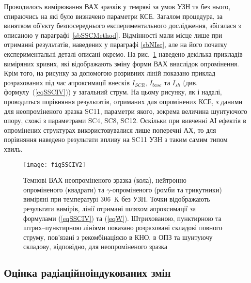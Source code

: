 Проводилось вимірювання ВАХ зразків у темряві за умов УЗН та без нього, спираючись на які було визначено параметри КСЕ.
Загалом процедура, за винятком об'єкту безпосереднього експериментального дослідження,
збігалася з описаною у параграфі~\ref{sbSSCMethod}.
Відмінності мали місце лише при отриманні результатів, наведених у параграфі \ref{sbNIsc},
але на його початку експериментальні деталі описані окремо.
На рис.~\ref{figSSCIV2} наведено декілька прикладів виміряних кривих, які відображають
зміну форми ВАХ внаслідок опромінення.
Крім того, на рисунку за допомогою розривних ліній показано приклад розрахованих під час апроксимації внесків $I_{SCR}$, $I_{base}$ та $I_{sh}$
(див. формулу~(\ref{eqSSCIV})) у загальний струм.
На цьому рисунку, як і надалі, проводиться порівняння результатів,
отриманих для опромінених КСЕ, з даними для неопроміненого зразка SC11, параметри якого, зокрема величина шунтуючого опору,
схожі з параметрами SC4, SC8, SC12.
Оскільки при вивченні АІ ефектів в опромінених структурах використовувалися лише поперечні АХ,
то для порівняння наведено результати впливу на SC11 УЗН з таким самим типом хвиль.

\begin{figure}
\center
\texttt{[image: figSSCIV2]}%
\caption{\label{figSSCIV2}
Темнові ВАХ неопроміненого зразка (кола), нейтронно--опроміненого (квадрати) та $\gamma$-опроміненого (ромби та трикутники) виміряні при температурі 306~K без УЗН.
Точки відображають результати вимірів, лінії отримані шляхом апроксимації за формулами (\ref{eqSSCIV}) та (\ref{eqW}).
Штрихованою, пунктирною та штрих--пунктирною лініями показано розраховані складові повного струму, пов'язані з рекомбінаціяєю в КНО, в ОПЗ та шунтуючу складову, відповідно,
для неопроміненого зразка
}%
\end{figure}



\subsection{Оцінка радіаційноіндукованих змін\label{sbRadDefCreate}}

